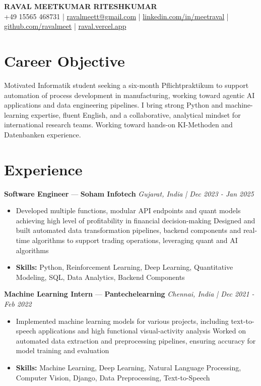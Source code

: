 \documentclass[a4paper,10pt]{article}
\begin{document}
\begin{center}
  {\Large\bfseries RAVAL MEETKUMAR RITESHKUMAR}\\[2pt]
  {\small +49 15565 468731 \;|\; \href{mailto:ravalmeett@gmail.com}{ravalmeett@gmail.com} \;|\; \href{https://www.linkedin.com/in/meetraval/}{linkedin.com/in/meetraval} \;|\; \href{https://github.com/ravalmeet}{github.com/ravalmeet} \;|\; \href{https://raval.vercel.app/}{raval.vercel.app}}
\end{center}
\vspace{-3pt}

\section*{Career Objective}
Motivated Informatik student seeking a six-month Pflichtpraktikum to support automation of process development in manufacturing, working toward agentic AI applications and data engineering pipelines. I bring strong Python and machine-learning expertise, fluent English, and a collaborative, analytical mindset for international research teams. Working toward hands-on KI-Methoden and Datenbanken experience.\par

\section*{Experience}
\textbf{Software Engineer} — \textbf{Soham Infotech} \hfill \textit{Gujarat, India \;|\; Dec 2023 - Jan 2025}\par
\vspace{1pt}
\begin{itemize}
  \item Developed multiple functions, modular API endpoints and quant models achieving high level of profitability in financial decision-making Designed and built automated data transformation pipelines, backend components and real-time algorithms to support trading operations, leveraging quant and AI algorithms
  \item \textbf{Skills:} Python, Reinforcement Learning, Deep Learning, Quantitative Modeling, SQL, Data Analytics, Backend Components
\end{itemize}
\vspace{3pt}
\textbf{Machine Learning Intern} — \textbf{Pantechelearning} \hfill \textit{Chennai, India \;|\; Dec 2021 - Feb 2022}\par
\vspace{1pt}
\begin{itemize}
  \item Implemented machine learning models for various projects, including text-to-speech applications and high functional visual-activity analysis Worked on automated data extraction and preprocessing pipelines, ensuring accuracy for model training and evaluation
  \item \textbf{Skills:} Machine Learning, Deep Learning, Natural Language Processing, Computer Vision, Django, Data Preprocessing, Text-to-Speech
\end{itemize}
\end{document}
